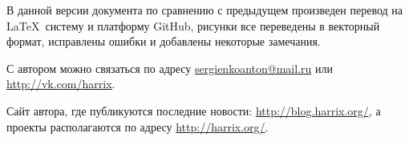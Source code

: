 В данной версии документа по сравнению с предыдущем произведен перевод на \LaTeX\ систему и платформу GitHub, рисунки все переведены в векторный формат, исправлены ошибки и добавлены некоторые замечания.

С автором можно связаться по адресу \href{mailto:sergienkoanton@mail.ru}{sergienkoanton@mail.ru} или  \href{http://vk.com/harrix}{http://vk.com/harrix}.

Сайт автора, где публикуются последние новости: \href{http://blog.harrix.org/}{http://blog.harrix.org/}, а проекты располагаются по адресу \href{http://harrix.org/}{http://harrix.org/}.

\singlespacing
\clearpage